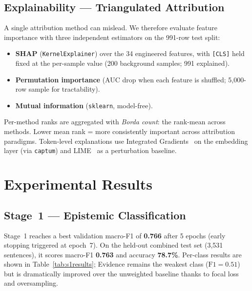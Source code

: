 \documentclass[conference]{IEEEtran}
\begin{document}
\subsection{Explainability --- Triangulated Attribution}

A single attribution method can mislead. We therefore evaluate feature
importance with three independent estimators on the 991-row test split:
\begin{itemize}[leftmargin=*,nosep]
\item \textbf{SHAP} (\texttt{KernelExplainer}) over the 34 engineered
features, with \texttt{[CLS]} held fixed at the per-sample value (200
background samples; 991 explained).
\item \textbf{Permutation importance} (AUC drop when each feature is
shuffled; 5{,}000-row sample for tractability).
\item \textbf{Mutual information} (\texttt{sklearn}, model-free).
\end{itemize}
Per-method ranks are aggregated with \emph{Borda count}: the rank-mean
across methods. Lower mean rank = more consistently important across
attribution paradigms. Token-level explanations use Integrated
Gradients~\cite{sundararajan2017axiomatic} on the embedding layer
(via \texttt{captum}) and LIME~\cite{ribeiro2016lime} as a perturbation
baseline.

\section{Experimental Results}

\subsection{Stage~1 — Epistemic Classification}

Stage~1 reaches a best validation macro-F1 of \textbf{0.766} after 5
epochs (early stopping triggered at epoch~7). On the held-out combined
test set (3{,}531 sentences), it scores macro-F1
\textbf{0.763} and accuracy \textbf{78.7\%}. Per-class results are
shown in Table~\ref{tab:s1results}; Evidence remains the weakest class
($\text{F1}{=}0.51$) but is dramatically improved over the
unweighted baseline thanks to focal loss and oversampling.
\end{document}

